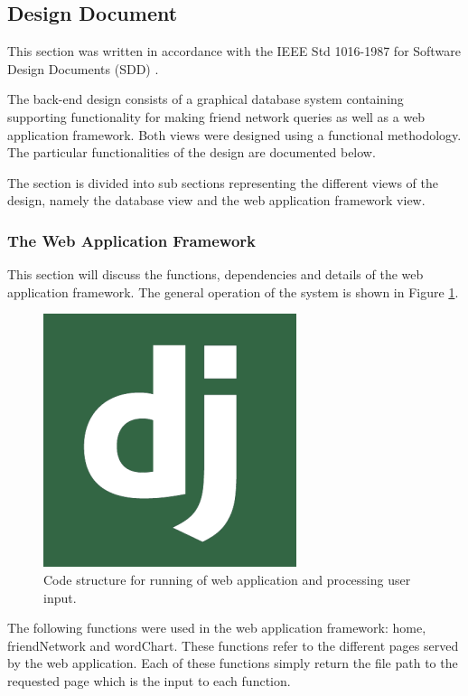 \documentclass[12pt,onecolumn]{article}
\begin{document}
	\subsection{Design Document} %
	This section was written in accordance with the IEEE Std 1016-1987 for Software Design Documents (SDD) \cite{IEEE}. 
	
	The back-end design consists of a graphical database system containing supporting functionality for making friend network queries as well as a web application framework. Both views were designed using a functional methodology. The particular functionalities of the design are documented below.
	
	The section is divided into sub sections representing the different views of the design, namely the database view and the web application framework view.
	
	\subsubsection{The Web Application Framework}
	This section will discuss the functions, dependencies and details of the web application framework. The general operation of the system is shown in Figure \ref{fig:django}.
	
		\begin{figure}[htb] 
			\centering
			\includegraphics[scale=1]{django}
			\caption{Code structure for running of web application and processing user input.} \label{fig:django}
		\end{figure}
		
	The following functions were used in the web application framework: home, friendNetwork and wordChart. These functions refer to the different pages served by the web application. Each of these functions simply return the file path to the requested page which is the input to each function.
	
\end{document}
